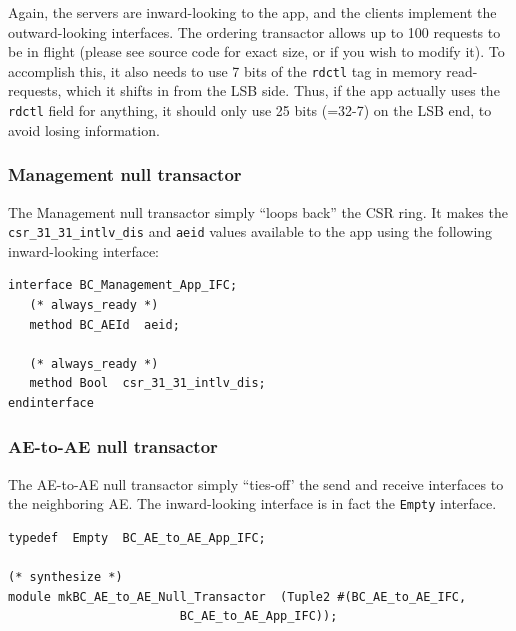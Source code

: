\documentclass[twoside,letterpaper,11pt]{article}
\begin{document}
Again, the servers are inward-looking to the app, and the clients
implement the outward-looking interfaces.  The ordering transactor
allows up to 100 requests to be in flight (please see source code for
exact size, or if you wish to modify it).  To accomplish this, it also
needs to use 7 bits of the \verb|rdctl| tag in memory read-requests,
which it shifts in from the LSB side.  Thus, if the app actually uses
the \verb|rdctl| field for anything, it should only use 25 bits
(=32-7) on the LSB end, to avoid losing information.


\subsubsection{Management null transactor}

\label{sec_management_null_transactor}

The Management null transactor simply ``loops back'' the CSR ring.  It
makes the \verb|csr_31_31_intlv_dis| and \verb|aeid| values available
to the app using the following inward-looking interface:
\begin{Verbatim}[frame=single, label=BC\_Transactors.bsv]
interface BC_Management_App_IFC;
   (* always_ready *)
   method BC_AEId  aeid;

   (* always_ready *)
   method Bool  csr_31_31_intlv_dis;
endinterface
\end{Verbatim}


\subsubsection{AE-to-AE null transactor}

\label{sec_AE_to_AE_null_transactor}

The AE-to-AE null transactor simply ``ties-off' the send and receive
interfaces to the neighboring AE.  The inward-looking interface is in
fact the \verb|Empty| interface.
\begin{Verbatim}[frame=single, label=BC\_Transactors.bsv]
typedef  Empty  BC_AE_to_AE_App_IFC;

(* synthesize *)
module mkBC_AE_to_AE_Null_Transactor  (Tuple2 #(BC_AE_to_AE_IFC,
						BC_AE_to_AE_App_IFC));
\end{Verbatim}

\end{document}
